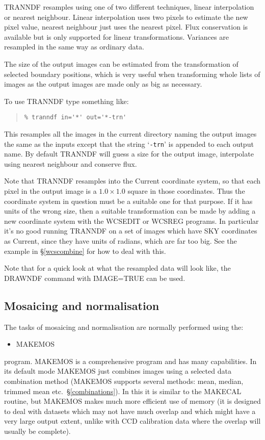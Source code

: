 \documentclass[twoside,11pt]{article}
\newcommand{\hyperref}[4]{#2\ref{#4}#3}
\newcommand{\htmlref}[2]{#1}
\newcommand{\xlabel}[1]{}
\renewcommand{\_}{\texttt{\symbol{95}}}
\newenvironment{myquote}{\begin{quote}\begin{small}}{\end{small}\end{quote}}
\newcommand{\text}[1]{{\small \tt #1}}
\newcommand{\routine}[1]{{\sc #1}}
\newcommand{\xroutine}[1]{\htmlref{{\sc #1}}{#1}}
\begin{document}
\routine{TRANNDF} resamples using 
one of two different techniques, linear interpolation
or nearest neighbour. Linear interpolation uses two pixels to estimate
the new pixel value, nearest neighbour just uses the nearest pixel. Flux
conservation is available but is only supported for linear
transformations. Variances are resampled in the same way as ordinary
data.

The size of the output images can be estimated from the transformation of
selected boundary positions, which is very useful when transforming whole
lists of images as the output images are made only as big as necessary.

To use \routine{TRANNDF} type something like:
\begin{myquote}
\begin{verbatim}
% tranndf in='*' out='*-trn'
\end{verbatim}
\end{myquote}
This resamples all the images in the current directory naming the output
images the same as the inputs except that the string `\text{-trn}' is
appended to each output name. 
By default \routine{TRANNDF} will guess a size for
the output image, interpolate using nearest neighbour and conserve flux.

Note that \routine{TRANNDF} resamples into the Current coordinate system,
so that each pixel in the output image is a $1.0 \times 1.0$ square 
in those coordinates.  Thus the coordinate system in question must be
a suitable one for that purpose.  If it has units of 
the wrong size, then a suitable transformation can be made by
adding a new coordinate system with the
\xroutine{WCSEDIT} or \xroutine{WCSREG} programs.
In particular it's no good running \routine{TRANNDF} on a set of
images which have SKY coordinates as Current, since they have
units of radians, which are far too big.
See the example in \hyperref{the section about WCSREG}{\S }{}{wcscombine}
for how to deal with this.

Note that for a quick look at what the resampled data will look like,
the \xroutine{DRAWNDF} command with IMAGE=TRUE can be used.


\subsection{\xlabel{mosaic_normalise}\label{mos_norm}Mosaicing and 
            normalisation}

The tasks of mosaicing and normalisation are normally performed using the:
\begin{itemize}
\item \xroutine{MAKEMOS}
\end{itemize}
program.
\routine{MAKEMOS} is a comprehensive program and has many
capabilities. In its default mode \routine{MAKEMOS} 
just combines images using a
selected data combination method (\routine{MAKEMOS} supports several
methods: mean, median, trimmed mean etc.\ \S\ref{combinations}).
In this it is similar to the \xroutine{MAKECAL} routine, but
\routine{MAKEMOS} makes much more efficient use of
memory (it is designed to deal with datasets which may not have much
overlap and which might have a very large output extent, unlike with CCD
calibration data where the overlap will usually be complete).
\end{document}
